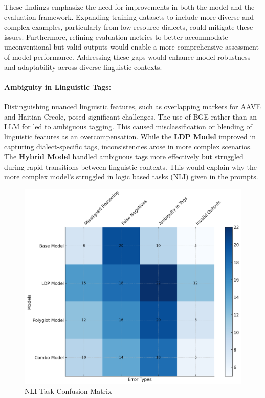 These findings emphasize the need for improvements in both the model and the evaluation framework. Expanding training datasets to include more diverse and complex examples, particularly from low-resource dialects, could mitigate these issues. Furthermore, refining evaluation metrics to better accommodate unconventional but valid outputs would enable a more comprehensive assessment of model performance. Addressing these gaps would enhance model robustness and adaptability across diverse linguistic contexts.

\paragraph{Ambiguity in Linguistic Tags:}
Distinguishing nuanced linguistic features, such as overlapping markers for AAVE and Haitian Creole, posed significant challenges. The use of BGE rather than an LLM for led to ambiguous tagging. This caused misclassification or blending of linguistic features as an overcompensation. While the \textbf{LDP Model} improved in capturing dialect-specific tags, inconsistencies arose in more complex scenarios. The \textbf{Hybrid Model} handled ambiguous tags more effectively but struggled during rapid transitions between linguistic contexts. This would explain why the more complex model's struggled in logic based tasks (NLI) given in the prompts.

\begin{figure}[h!]
    \centering
    \includegraphics[width= \linewidth]{output.png}
    \caption{NLI Task Confusion Matrix}
    \label{fig:enter-label}
\end{figure}

